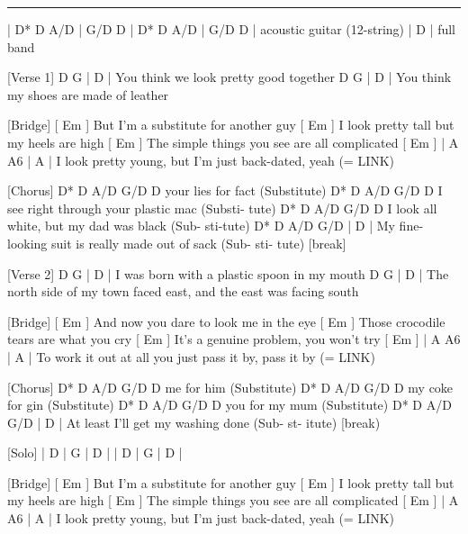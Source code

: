 \noindent\rule{\columnwidth}{1pt}

\begin{lstsong}
[Intro]
| D* D A/D   | G/D D | D* D A/D   | G/D D |
  acoustic guitar (12-string)
| D | %
 full band
 
[Verse 1]
D             G                 |  D  |  %
 You think we look pretty good together
D             G                 |  D  |  %
 You think my shoes are made of leather
 
[Bridge]
         [ Em ]
But I'm a substitute for another guy
 [ Em ]
I look pretty tall but my heels are high
   [ Em ]
The simple things you see are all complicated
 [ Em ]                                      |  A    A6 |  A  |
I look pretty young, but I'm just back-dated, yeah (= LINK)
 
[Chorus]
D* D  A/D         G/D      D
             your lies for fact
(Substitute)
  D*  D     A/D          G/D     D
I see right through your plastic mac
 (Substi-   tute)
  D*   D   A/D           G/D     D
I look all white, but my dad was black
 (Sub- sti-tute)
   D*   D       A/D            G/D        |  D  |  %
My fine-looking suit is really made out of sack
  (Sub- sti-    tute)                     [break]
 
[Verse 2]
D                  G               |  D  |  %
 I was born with a plastic spoon in my mouth
    D                     G                            |  D  |  %
The north side of my town faced east, and the east was facing south
 
[Bridge]
           [ Em ]
And now you dare to look me in the eye
     [ Em ]
Those crocodile tears are what you cry
      [ Em ]
It's a genuine problem, you won't try
  [ Em ]                                         |  A    A6 |  A  |
To work it out at all you just pass it by, pass it by  (= LINK)
 
[Chorus]
 D* D  A/D     G/D    D
               me for him
(Substitute)
D* D  A/D       G/D      D
             my coke for gin
(Substitute)
D* D  A/D       G/D    D
            you for my mum
(Substitute)
   D*    D     A/D   G/D     |  D  |  %
At least I'll get my washing done
  (Sub-  st-  itute)         [break)
 
[Solo]
| D | G | D | %
| D | G | D | %
 
[Bridge]
         [ Em ]
But I'm a substitute for another guy
 [ Em ]
I look pretty tall but my heels are high
   [ Em ]
The simple things you see are all complicated
 [ Em ]                                      |  A    A6 |  A  |
I look pretty young, but I'm just back-dated, yeah (= LINK)
 

\end{lstsong}
